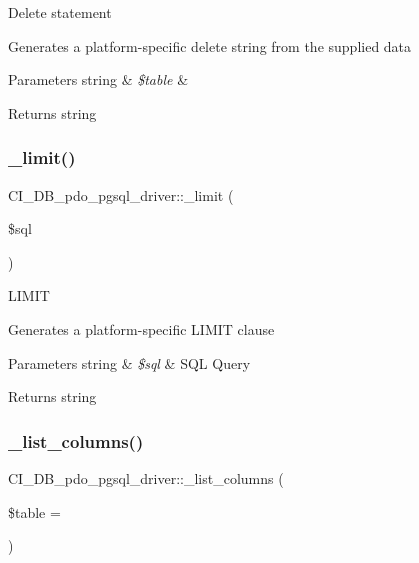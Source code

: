 Delete statement

Generates a platform-\/specific delete string from the supplied data


\begin{DoxyParams}[1]{Parameters}
string & {\em \$table} & \\
\hline
\end{DoxyParams}
\begin{DoxyReturn}{Returns}
string 
\end{DoxyReturn}
\mbox{\label{class_c_i___d_b__pdo__pgsql__driver_a318e57fd3c345f251f3320b4ccd3a96b}} 
\subsubsection{\texorpdfstring{\+\_\+limit()}{\_limit()}}
{\footnotesize\ttfamily C\+I\+\_\+\+D\+B\+\_\+pdo\+\_\+pgsql\+\_\+driver\+::\+\_\+limit (\begin{DoxyParamCaption}\item[{}]{\$sql }\end{DoxyParamCaption})\hspace{0.3cm}{\ttfamily [protected]}}

L\+I\+M\+IT

Generates a platform-\/specific L\+I\+M\+IT clause


\begin{DoxyParams}[1]{Parameters}
string & {\em \$sql} & S\+QL Query \\
\hline
\end{DoxyParams}
\begin{DoxyReturn}{Returns}
string 
\end{DoxyReturn}
\mbox{\label{class_c_i___d_b__pdo__pgsql__driver_a5169cf672887f2107c9170c8e145807a}} 
\subsubsection{\texorpdfstring{\+\_\+list\+\_\+columns()}{\_list\_columns()}}
{\footnotesize\ttfamily C\+I\+\_\+\+D\+B\+\_\+pdo\+\_\+pgsql\+\_\+driver\+::\+\_\+list\+\_\+columns (\begin{DoxyParamCaption}\item[{}]{\$table = {\ttfamily \textquotesingle{}\textquotesingle{}} }\end{DoxyParamCaption})\hspace{0.3cm}{\ttfamily [protected]}}

